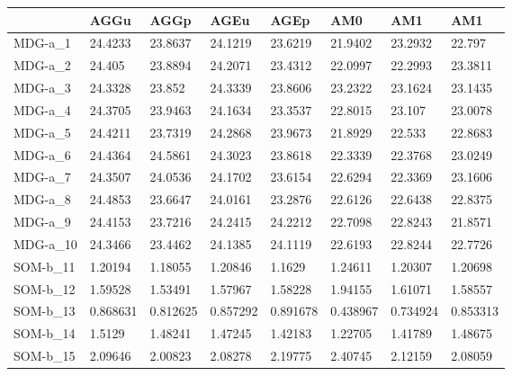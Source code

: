 \documentclass[11pt,a4paper]{article}
\begin{document}
	\begin{table}[H]
		\begin{tabular}{l|l|l|l|l|l|l|l|}
			\cline{2-8}
			& AGGu     & AGGp     & AGEu     & AGEp     & AM0      & AM1      & AM1      \\ \hline
			\multicolumn{1}{|l|}{MDG-a\_1}  & 24.4233  & 23.8637  & 24.1219  & 23.6219  & 21.9402  & 23.2932  & 22.797   \\ \hline
			\multicolumn{1}{|l|}{MDG-a\_2}  & 24.405   & 23.8894  & 24.2071  & 23.4312  & 22.0997  & 22.2993  & 23.3811  \\ \hline
			\multicolumn{1}{|l|}{MDG-a\_3}  & 24.3328  & 23.852   & 24.3339  & 23.8606  & 23.2322  & 23.1624  & 23.1435  \\ \hline
			\multicolumn{1}{|l|}{MDG-a\_4}  & 24.3705  & 23.9463  & 24.1634  & 23.3537  & 22.8015  & 23.107   & 23.0078  \\ \hline
			\multicolumn{1}{|l|}{MDG-a\_5}  & 24.4211  & 23.7319  & 24.2868  & 23.9673  & 21.8929  & 22.533   & 22.8683  \\ \hline
			\multicolumn{1}{|l|}{MDG-a\_6}  & 24.4364  & 24.5861  & 24.3023  & 23.8618  & 22.3339  & 22.3768  & 23.0249  \\ \hline
			\multicolumn{1}{|l|}{MDG-a\_7}  & 24.3507  & 24.0536  & 24.1702  & 23.6154  & 22.6294  & 22.3369  & 23.1606  \\ \hline
			\multicolumn{1}{|l|}{MDG-a\_8}  & 24.4853  & 23.6647  & 24.0161  & 23.2876  & 22.6126  & 22.6438  & 22.8375  \\ \hline
			\multicolumn{1}{|l|}{MDG-a\_9}  & 24.4153  & 23.7216  & 24.2415  & 24.2212  & 22.7098  & 22.8243  & 21.8571  \\ \hline
			\multicolumn{1}{|l|}{MDG-a\_10} & 24.3466  & 23.4462  & 24.1385  & 24.1119  & 22.6193  & 22.8244  & 22.7726  \\ \hline
			\multicolumn{1}{|l|}{SOM-b\_11} & 1.20194  & 1.18055  & 1.20846  & 1.1629   & 1.24611  & 1.20307  & 1.20698  \\ \hline
			\multicolumn{1}{|l|}{SOM-b\_12} & 1.59528  & 1.53491  & 1.57967  & 1.58228  & 1.94155  & 1.61071  & 1.58557  \\ \hline
			\multicolumn{1}{|l|}{SOM-b\_13} & 0.868631 & 0.812625 & 0.857292 & 0.891678 & 0.438967 & 0.734924 & 0.853313 \\ \hline
			\multicolumn{1}{|l|}{SOM-b\_14} & 1.5129   & 1.48241  & 1.47245  & 1.42183  & 1.22705  & 1.41789  & 1.48675  \\ \hline
			\multicolumn{1}{|l|}{SOM-b\_15} & 2.09646  & 2.00823  & 2.08278  & 2.19775  & 2.40745  & 2.12159  & 2.08059  \\ \hline

\end{tabular}
\end{table}
\end{document}
